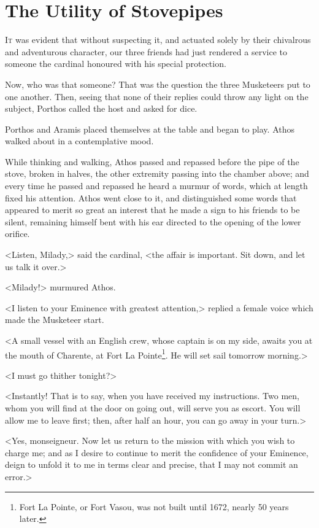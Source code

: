 
\chapter{The Utility of Stovepipes}

\lettrine{I}{t} was evident that without suspecting it, and actuated solely by their chivalrous and adventurous character, our three friends had just rendered a service to someone the cardinal honoured with his special protection. 

\zz
Now, who was that someone? That was the question the three Musketeers put to one another. Then, seeing that none of their replies could throw any light on the subject, Porthos called the host and asked for dice. 

Porthos and Aramis placed themselves at the table and began to play. Athos walked about in a contemplative mood. 

While thinking and walking, Athos passed and repassed before the pipe of the stove, broken in halves, the other extremity passing into the chamber above; and every time he passed and repassed he heard a murmur of words, which at length fixed his attention. Athos went close to it, and distinguished some words that appeared to merit so great an interest that he made a sign to his friends to be silent, remaining himself bent with his ear directed to the opening of the lower orifice. 

<Listen, Milady,> said the cardinal, <the affair is important. Sit down, and let us talk it over.> 

<Milady!> murmured Athos. 

<I listen to your Eminence with greatest attention,> replied a female voice which made the Musketeer start. 

<A small vessel with an English crew, whose captain is on my side, awaits you at the mouth of Charente, at Fort La Pointe\footnote{Fort La Pointe, or Fort Vasou, was not built until 1672, nearly 50 years later. }. He will set sail tomorrow morning.> 

<I must go thither tonight?> 

<Instantly! That is to say, when you have received my instructions. Two men, whom you will find at the door on going out, will serve you as escort. You will allow me to leave first; then, after half an hour, you can go away in your turn.> 

<Yes, monseigneur. Now let us return to the mission with which you wish to charge me; and as I desire to continue to merit the confidence of your Eminence, deign to unfold it to me in terms clear and precise, that I may not commit an error.> 


